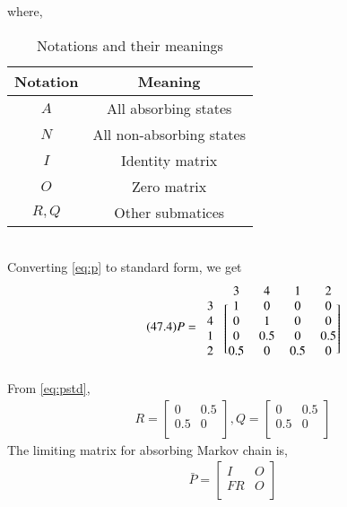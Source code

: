 \documentclass[journal,12pt,twocolumn]{IEEEtran}
\begin{document}
where, 
\begin{table}[h!]
\centering
\caption{Notations and their meanings}
\label{table:2}
\begin{tabular}{|c|c|}
    \hline
    Notation & Meaning \\
    \hline
    $A$ & All absorbing states\\[1ex]
    \hline
    $N$ & All non-absorbing states\\[1ex]
    \hline
    $I$ & Identity matrix\\[1ex]
    \hline
    $O$ & Zero matrix\\[1ex]
    \hline
    $R,Q$ & Other submatices\\[1ex]
    \hline
\end{tabular}
\end{table}
\\Converting \eqref{eq:p} to standard form, we get
\begin{align}
\tag{47.4}
\label{eq:pstd}
    P=\begin{blockarray}{cccccc}
& 3 & 4 & 1 & 2 \\
\begin{block}{c[ccccc]}
  3 & 1 & 0 & 0 & 0 \\
  4 & 0 & 1 & 0 & 0 \\
  1 & 0 & 0.5 & 0 & 0.5  \\
  2 & 0.5 & 0 & 0.5 & 0  \\
\end{block}
\end{blockarray}
\end{align}
From \eqref{eq:pstd},
\begin{align}
\tag{47.5}
\label{eq:r,q}
    R=\begin{bmatrix}
    0 & 0.5\\
    0.5 & 0\\
    \end{bmatrix},
    Q=\begin{bmatrix}
    0 & 0.5 \\
    0.5 & 0 \\
    \end{bmatrix}
\end{align}
The limiting matrix for absorbing Markov chain is,
\begin{align}
\tag{47.6}
\label{eq:pbar}
    \bar P=\begin{bmatrix}
    I & O\\
    FR & O\\
    \end{bmatrix}
\end{align}
\end{document}
